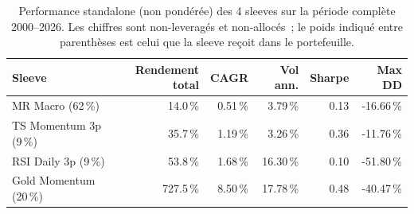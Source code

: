 \begin{table}[H]
\centering
\caption{Performance standalone (non pondérée) des 4 sleeves sur la période complète 2000--2026. Les chiffres sont non-leveragés et non-allocés~; le poids indiqué entre parenthèses est celui que la sleeve reçoit dans le portefeuille.}
\label{tab:sleeve_standalone}
\begin{tabular}{lrrrrr}
\toprule
Sleeve & Rendement total & CAGR & Vol ann. & Sharpe & Max DD \\
\midrule
MR Macro (62\,\%) & 14.0\,\% & 0.51\,\% & 3.79\,\% & 0.13 & -16.66\,\% \\
TS Momentum 3p (9\,\%) & 35.7\,\% & 1.19\,\% & 3.26\,\% & 0.36 & -11.76\,\% \\
RSI Daily 3p (9\,\%) & 53.8\,\% & 1.68\,\% & 16.30\,\% & 0.10 & -51.80\,\% \\
Gold Momentum (20\,\%) & 727.5\,\% & 8.50\,\% & 17.78\,\% & 0.48 & -40.47\,\% \\
\bottomrule
\end{tabular}
\end{table}
